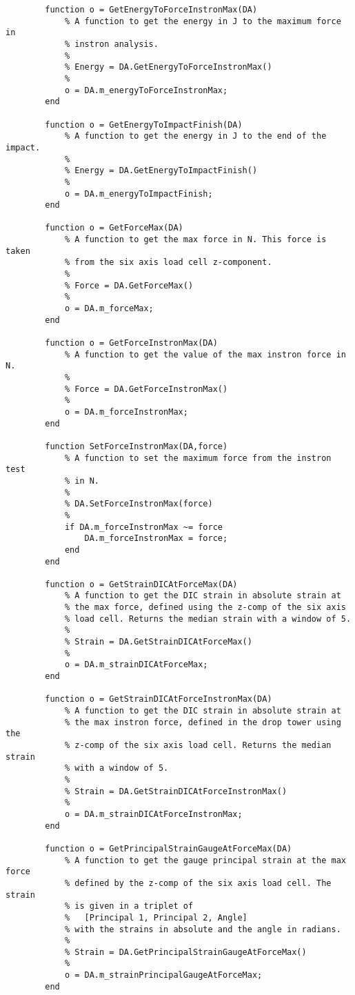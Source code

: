 \begin{lstlisting}
        function o = GetEnergyToForceInstronMax(DA)
            % A function to get the energy in J to the maximum force in 
            % instron analysis.
            %
            % Energy = DA.GetEnergyToForceInstronMax()
            %
            o = DA.m_energyToForceInstronMax;
        end
        
        function o = GetEnergyToImpactFinish(DA)
            % A function to get the energy in J to the end of the impact.
            %
            % Energy = DA.GetEnergyToImpactFinish()
            %
            o = DA.m_energyToImpactFinish;
        end
        
        function o = GetForceMax(DA)
            % A function to get the max force in N. This force is taken
            % from the six axis load cell z-component.
            %
            % Force = DA.GetForceMax()
            %
            o = DA.m_forceMax;
        end
        
        function o = GetForceInstronMax(DA)
            % A function to get the value of the max instron force in N.
            %
            % Force = DA.GetForceInstronMax()
            %
            o = DA.m_forceInstronMax;
        end
        
        function SetForceInstronMax(DA,force)
            % A function to set the maximum force from the instron test
            % in N.
            %
            % DA.SetForceInstronMax(force)
            %
            if DA.m_forceInstronMax ~= force
                DA.m_forceInstronMax = force;
            end
        end
        
        function o = GetStrainDICAtForceMax(DA)
            % A function to get the DIC strain in absolute strain at
            % the max force, defined using the z-comp of the six axis
            % load cell. Returns the median strain with a window of 5.
            %
            % Strain = DA.GetStrainDICAtForceMax()
            %
            o = DA.m_strainDICAtForceMax;
        end
        
        function o = GetStrainDICAtForceInstronMax(DA)
            % A function to get the DIC strain in absolute strain at
            % the max instron force, defined in the drop tower using the
            % z-comp of the six axis load cell. Returns the median strain 
            % with a window of 5.
            %
            % Strain = DA.GetStrainDICAtForceInstronMax()
            %
            o = DA.m_strainDICAtForceInstronMax;
        end
        
        function o = GetPrincipalStrainGaugeAtForceMax(DA)
            % A function to get the gauge principal strain at the max force
            % defined by the z-comp of the six axis load cell. The strain
            % is given in a triplet of
            %   [Principal 1, Principal 2, Angle]
            % with the strains in absolute and the angle in radians.
            %
            % Strain = DA.GetPrincipalStrainGaugeAtForceMax()
            %
            o = DA.m_strainPrincipalGaugeAtForceMax;
        end
        

\end{lstlisting}
